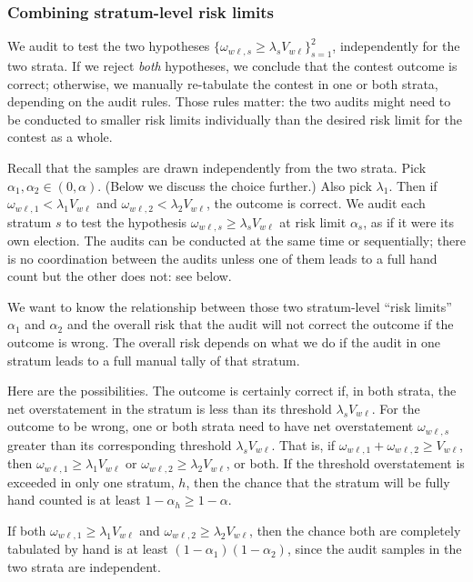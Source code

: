 \subsubsection{Combining stratum-level risk limits}\label{sec:stratumRisk}
We audit to test the two hypotheses $\{\omega_{w\ell,s} \ge \lambda_s V_{w\ell}\}_{s=1}^2$, 
independently for the two strata.
If we reject \emph{both} hypotheses, we conclude that the contest outcome is correct;
otherwise, we manually re-tabulate the contest in one or both strata, depending on the
audit rules.
Those rules matter:
the two audits might need to be conducted to smaller risk limits individually than the desired
risk limit for the contest as a whole.

Recall that the samples are drawn independently from the two strata.
Pick $\alpha_1, \alpha_2 \in (0,\alpha)$.
(Below we discuss the choice further.)
Also pick $\lambda_1$.
Then if $\omega_{w\ell,1} < \lambda_1 V_{w\ell}$ and 
$\omega_{w\ell,2} < \lambda_2 V_{w\ell}$,
the outcome is correct.
We audit each stratum $s$ to test the hypothesis $\omega_{w\ell,s} \ge \lambda_s V_{w\ell}$ 
at risk limit $\alpha_s$,
as if it were its own election.
The audits can be conducted at the same time or sequentially; there is no coordination
between the audits unless one of them leads to a full hand count but the other does not:
see below.

We want to know the relationship between those two stratum-level ``risk limits'' $\alpha_1$ and
$\alpha_2$ and the 
overall risk that the audit will not correct the outcome if the outcome is wrong.
The overall risk depends on what we do if the audit in one stratum leads to a full manual
tally of that stratum.

Here are the possibilities.
The outcome is certainly correct if, in both strata, the net overstatement in the stratum is less
than its threshold $\lambda_s V_{w\ell}$.
For the outcome to be wrong, one or both strata need to have net overstatement
$\omega_{w\ell,s}$
greater than its corresponding threshold $\lambda_s V_{w\ell}$.
That is, if $\omega_{w\ell,1} + \omega_{w\ell,2} \ge V_{w\ell}$, then $\omega_{w\ell,1}\ge \lambda_1V_{w\ell}$
or $\omega_{w\ell,2}\ge \lambda_2V_{w\ell}$, or both.
If the threshold overstatement is exceeded in only one stratum, $h$, then the chance that the 
stratum will be fully hand counted is at least $1-\alpha_h \ge 1- \alpha$.

If both $\omega_{w\ell,1} \ge \lambda_1V_{w\ell}$
and $\omega_{w\ell,2} \ge \lambda_2V_{w\ell}$, then the chance both 
are completely tabulated by hand is at least
$(1-\alpha_1)(1-\alpha_2)$, since the audit samples in the two strata are independent.

